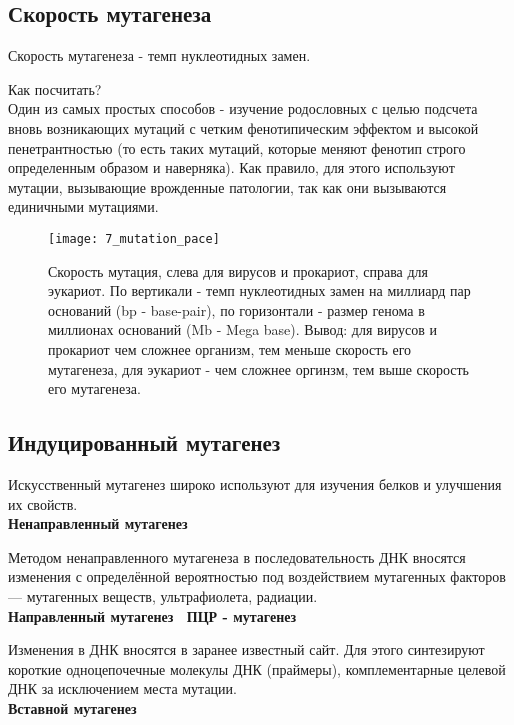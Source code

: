 \subsection{Скорость мутагенеза}

Скорость мутагенеза - темп нуклеотидных замен. 

Как посчитать?\\

Один из самых простых способов - изучение родословных с целью подсчета вновь возникающих мутаций с четким фенотипическим эффектом и высокой пенетрантностью (то есть таких мутаций, которые меняют фенотип строго определенным образом и наверняка). Как правило, для этого используют мутации, вызывающие врожденные патологии, так как они  вызываются единичными мутациями.

\begin{figure}[H]
	\centering
	\texttt{[image: 7\_mutation\_pace]}
	\caption{Скорость мутация, слева для вирусов и прокариот, справа для эукариот. По вертикали - темп нуклеотидных замен на миллиард пар оснований (bp - base-pair), по горизонтали - размер генома в миллионах оснований (Mb - Mega base). Вывод: для вирусов и прокариот чем сложнее организм, тем меньше скорость его мутагенеза, для эукариот - чем сложнее оргинзм, тем выше скорость его мутагенеза.}
	\label{7_mutation_pace}
\end{figure}
	
\subsection{Индуцированный мутагенез}

Искусственный мутагенез широко используют для изучения белков и улучшения их свойств. \\

\textbf{Ненаправленный мутагенез}

Методом ненаправленного мутагенеза в последовательность ДНК вносятся изменения с определённой вероятностью под воздействием мутагенных факторов — мутагенных веществ, ультрафиолета, радиации. \\

\textbf{Направленный мутагенез \ ПЦР - мутагенез}

Изменения в ДНК вносятся в заранее известный сайт. Для этого синтезируют короткие одноцепочечные молекулы ДНК (праймеры), комплементарные целевой ДНК за исключением места мутации. \\

\textbf{Вставной мутагенез}

